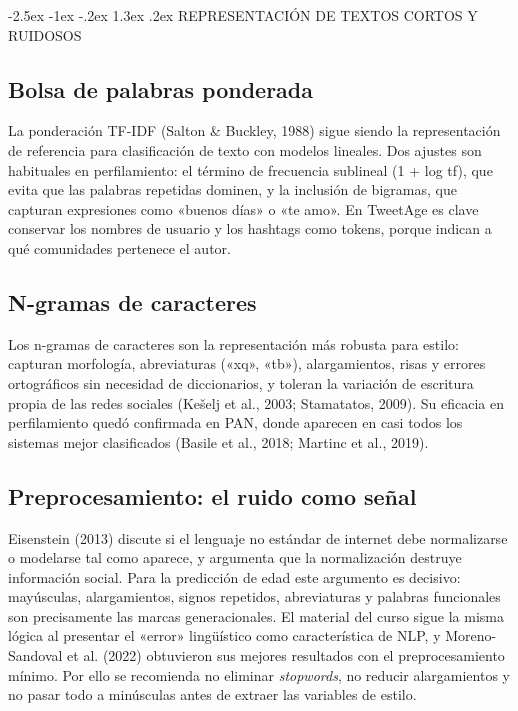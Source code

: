 \documentclass[10pt,twocolumn]{article}
\makeatletter
\renewcommand{\section}{\@startsection{section}{1}{\z@}%
  {-2.5ex \@plus -1ex \@minus -.2ex}%
  {1.3ex \@plus .2ex}%
  {\normalfont\large\bfseries\centering}}
\makeatother
\begin{document}
\section{REPRESENTACIÓN DE TEXTOS CORTOS Y RUIDOSOS}\label{sec:5}


\subsection{Bolsa de palabras ponderada}\label{sec:5.1}

La ponderación TF-IDF (Salton \& Buckley, 1988) sigue siendo la representación de referencia para clasificación de texto con modelos lineales. Dos ajustes son habituales en perfilamiento: el término de frecuencia sublineal (1 + log tf), que evita que las palabras repetidas dominen, y la inclusión de bigramas, que capturan expresiones como «buenos días» o «te amo». En TweetAge es clave conservar los nombres de usuario y los hashtags como tokens, porque indican a qué comunidades pertenece el autor.


\subsection{N-gramas de caracteres}\label{sec:5.2}

Los n-gramas de caracteres son la representación más robusta para estilo: capturan morfología, abreviaturas («xq», «tb»), alargamientos, risas y errores ortográficos sin necesidad de diccionarios, y toleran la variación de escritura propia de las redes sociales (Kešelj et al., 2003; Stamatatos, 2009). Su eficacia en perfilamiento quedó confirmada en PAN, donde aparecen en casi todos los sistemas mejor clasificados (Basile et al., 2018; Martinc et al., 2019).


\subsection{Preprocesamiento: el ruido como señal}\label{sec:5.3}

Eisenstein (2013) discute si el lenguaje no estándar de internet debe normalizarse o modelarse tal como aparece, y argumenta que la normalización destruye información social. Para la predicción de edad este argumento es decisivo: mayúsculas, alargamientos, signos repetidos, abreviaturas y palabras funcionales son precisamente las marcas generacionales. El material del curso sigue la misma lógica al presentar el «error» lingüístico como característica de NLP, y Moreno-Sandoval et al. (2022) obtuvieron sus mejores resultados con el preprocesamiento mínimo. Por ello se recomienda no eliminar \textit{stopwords}, no reducir alargamientos y no pasar todo a minúsculas antes de extraer las variables de estilo.
\end{document}
